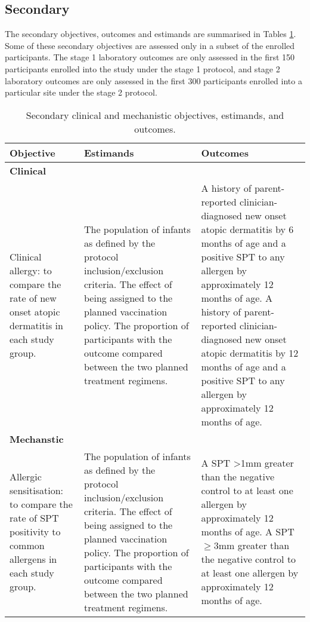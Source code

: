 \documentclass{bmcart}
\begin{document}
\subsection*{Secondary}

The secondary objectives, outcomes and estimands are summarised in Tables \ref{tab:objective-estimands-outcomes-clinical-mechanistic}.
Some of these secondary objectives are assessed only in a subset of the enrolled participants.
The stage 1 laboratory outcomes are only assessed in the first 150 participants enrolled into the study under the stage 1 protocol, and stage 2 laboratory outcomes are only assessed in the first 300 participants enrolled into a particular site under the stage 2 protocol.

\begin{table}[h!]
	\caption{Secondary clinical and mechanistic objectives, estimands, and outcomes.}
	\label{tab:objective-estimands-outcomes-clinical-mechanistic}
	\begin{tabular}{p{4cm}p{4cm}p{4cm}}
		Objective & Estimands & Outcomes \\ \hline
		\textbf{Clinical} & & \\
		Clinical allergy: to compare the rate of new onset atopic dermatitis in each study group. &
		The population of infants as defined by the protocol inclusion/exclusion criteria.\newline
		The effect of being assigned to the planned vaccination policy.\newline
		The proportion of participants with the outcome compared between the two planned treatment regimens. &
		A history of parent-reported clinician-diagnosed new onset atopic dermatitis by 6 months of age and a positive SPT to any allergen by approximately 12 months of age.\newline
		A history of parent-reported clinician-diagnosed new onset atopic dermatitis by 12 months of age and a positive SPT to any allergen by approximately 12 months of age.
		\\
		\textbf{Mechanstic} & & \\
		Allergic sensitisation: to compare the rate of SPT positivity to common allergens in each study group. &
		The population of infants as defined by the protocol inclusion/exclusion criteria.\newline
		The effect of being assigned to the planned vaccination policy.\newline
		The proportion of participants with the outcome compared between the two planned treatment regimens. &
		A SPT >1mm greater than the negative control to at least one allergen by approximately 12 months of age.\newline
		A SPT $\geq$3mm greater than the negative control to at least one allergen by approximately 12 months of age.
		\\
		\hline
	\end{tabular}
\end{table}
\end{document}
